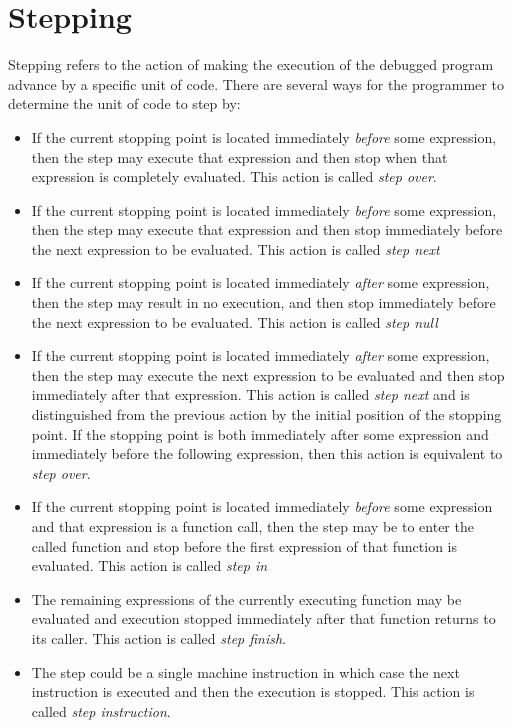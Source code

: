 \chapter{Stepping}

Stepping refers to the action of making the execution of the debugged
program advance by a specific unit of code.  There are several ways
for the programmer to determine the unit of code to step by:

\begin{itemize}
\item If the current stopping point is located immediately
  \emph{before} some expression, then the step may execute that
  expression and then stop when that expression is completely
  evaluated.  This action is called \emph{step over}.
\item If the current stopping point is located immediately
  \emph{before} some expression, then the step may execute that
  expression and then stop immediately before the next expression to
  be evaluated.  This action is called \emph{step next}
\item If the current stopping point is located immediately
  \emph{after} some expression, then the step may result in no
  execution, and then stop immediately before the next expression to
  be evaluated.  This action is called \emph{step null}
\item If the current stopping point is located immediately
  \emph{after} some expression, then the step may execute the next
  expression to be evaluated and then stop immediately after that
  expression.  This action is called \emph{step next} and is
  distinguished from the previous action by the initial position of
  the stopping point.  If the stopping point is both immediately after
  some expression and immediately before the following expression,
  then this action is equivalent to \emph{step over}.
\item If the current stopping point is located immediately
  \emph{before} some expression and that expression is a function
  call, then the step may be to enter the called function and stop
  before the first expression of that function is evaluated.  This
  action is called \emph{step in}
\item The remaining expressions of the currently executing function
  may be evaluated and execution stopped immediately after that
  function returns to its caller.  This action is called \emph{step
    finish}.
\item The step could be a single machine instruction in which case the
  next instruction is executed and then the execution is stopped.
  This action is called \emph{step instruction}.
\end{itemize}
